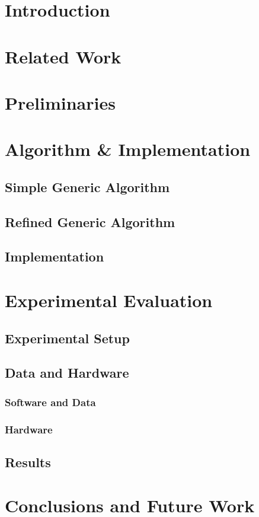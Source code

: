 \section{Introduction}
\label{sec:introduction}

\section{Related Work}
\label{sec:related_work}

\section{Preliminaries}
\label{sec:preliminaries}

\section{Algorithm \& Implementation}
\label{sec:algorithm_implementation}

\subsection{Simple Generic Algorithm}
\label{subsec:simple_algo}

\subsection{Refined Generic Algorithm}
\label{subsec:refined_algo}

\subsection{Implementation}
\label{subsec:implementation}

\section{Experimental Evaluation}
\label{sec:evaluation}

\subsection{Experimental Setup}
\label{subsec:exp_setup}

\subsection{Data and Hardware}
\label{subsec:hardware}

\subsubsection{Software and Data}
\label{subsubsec:software}

\subsubsection{Hardware}
\label{subsubsec:hardware}

\subsection{Results}
\label{subsec:results}

\section{Conclusions and Future Work}
\label{sec:discussion_conclusion}

